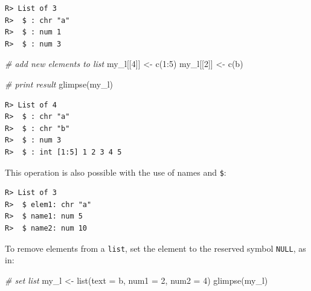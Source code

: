 \documentclass[
  12pt,
]{book}
\newenvironment{Shaded}{\begin{snugshade}}{\end{snugshade}}
\newcommand{\AttributeTok}[1]{\textcolor[rgb]{0.61,0.61,0.61}{#1}}
\newcommand{\CommentTok}[1]{\textcolor[rgb]{0.37,0.37,0.37}{\textit{#1}}}
\newcommand{\DecValTok}[1]{\textcolor[rgb]{0.06,0.06,0.06}{#1}}
\newcommand{\FunctionTok}[1]{\textcolor[rgb]{0,0,0}{#1}}
\newcommand{\NormalTok}[1]{#1}
\newcommand{\OtherTok}[1]{\textcolor[rgb]{0.37,0.37,0.37}{#1}}
\newcommand{\SpecialCharTok}[1]{\textcolor[rgb]{0,0,0}{#1}}
\newcommand{\StringTok}[1]{\textcolor[rgb]{0.5,0.5,0.5}{#1}}
\begin{document}
\begin{verbatim}
R> List of 3
R>  $ : chr "a"
R>  $ : num 1
R>  $ : num 3
\end{verbatim}

\begin{Shaded}
\begin{Highlighting}[]
\CommentTok{\# add new elements to list}
\NormalTok{my\_l[[}\DecValTok{4}\NormalTok{]] }\OtherTok{\textless{}{-}} \FunctionTok{c}\NormalTok{(}\DecValTok{1}\SpecialCharTok{:}\DecValTok{5}\NormalTok{)}
\NormalTok{my\_l[[}\DecValTok{2}\NormalTok{]] }\OtherTok{\textless{}{-}} \FunctionTok{c}\NormalTok{(}\StringTok{\textquotesingle{}b\textquotesingle{}}\NormalTok{)}

\CommentTok{\# print result}
\FunctionTok{glimpse}\NormalTok{(my\_l)}
\end{Highlighting}
\end{Shaded}

\begin{verbatim}
R> List of 4
R>  $ : chr "a"
R>  $ : chr "b"
R>  $ : num 3
R>  $ : int [1:5] 1 2 3 4 5
\end{verbatim}

This operation is also possible with the use of names and \texttt{\$}:

\begin{Shaded}
\end{Shaded}

\begin{verbatim}
R> List of 3
R>  $ elem1: chr "a"
R>  $ name1: num 5
R>  $ name2: num 10
\end{verbatim}

To remove elements from a \texttt{list}, set the element to the reserved symbol \texttt{NULL}, as in: 

\begin{Shaded}
\begin{Highlighting}[]
\CommentTok{\# set list}
\NormalTok{my\_l }\OtherTok{\textless{}{-}} \FunctionTok{list}\NormalTok{(}\AttributeTok{text =} \StringTok{\textquotesingle{}b\textquotesingle{}}\NormalTok{, }\AttributeTok{num1 =} \DecValTok{2}\NormalTok{, }\AttributeTok{num2 =} \DecValTok{4}\NormalTok{)}
\FunctionTok{glimpse}\NormalTok{(my\_l)}
\end{Highlighting}
\end{Shaded}
\end{document}
